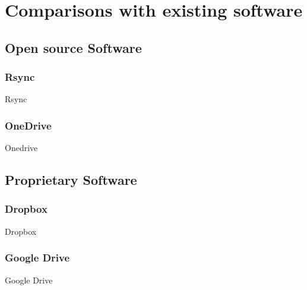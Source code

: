\chapter{Comparisons with existing software}


\section{Open source Software}
  \subsection{Rsync}
    Rsync
  \subsection{OneDrive}
    Onedrive
\section{Proprietary Software}
  \subsection{Dropbox}
    Dropbox
  \subsection{Google Drive}
    Google Drive
